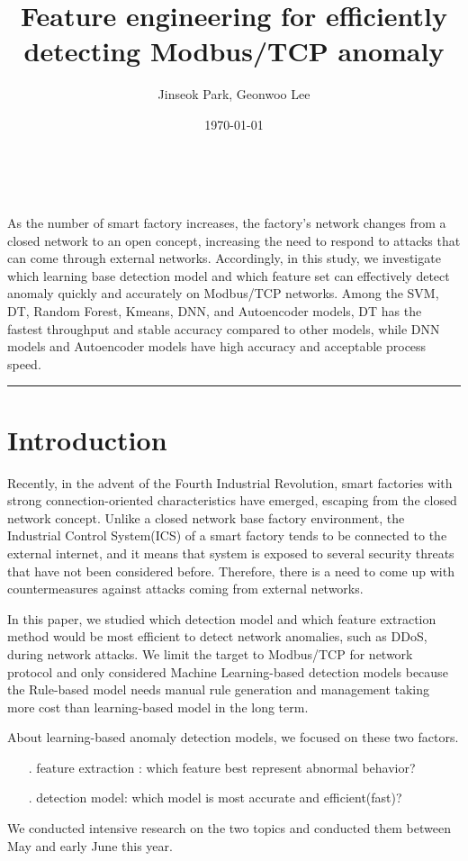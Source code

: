 \documentclass[fontsize=10pt]{article}
\title{
\Large Feature engineering for efficiently detecting Modbus/TCP anomaly \\
[10pt] 
}
\date{\today}
\author{Jinseok Park, Geonwoo Lee}
\makeatletter
\renewenvironment{abstract} %
 {\small
  \begin{center}
  \bfseries \abstractname\vspace{-.5em}\vspace{0pt}
  \end{center}
  \list{}{%
    \setlength{\leftmargin}{0mm}
    \setlength{\rightmargin}{\leftmargin}%
  }
  \item\relax}
 {\endlist}
\renewcommand{\maketitle}{\bgroup\setlength{\parindent}{0pt} %
\begin{flushleft}
  \textbf{\@title}
  \@author \\ 
  \@date
\end{flushleft}\egroup
}
\makeatother
\begin{document}
\maketitle

\begin{abstract}
As the number of smart factory increases, the factory's network changes from a closed network to an open concept, increasing the need to respond to attacks that can come through external networks. Accordingly, in this study, we investigate which learning base detection model and which feature set can effectively detect anomaly quickly and accurately on Modbus/TCP networks. Among the SVM, DT, Random Forest, Kmeans, DNN, and Autoencoder models, DT has the fastest throughput and stable accuracy compared to other models, while DNN models and Autoencoder models have high accuracy and acceptable process speed.
\end{abstract}

\rule{\linewidth}{0.5pt}


\section{Introduction}
Recently, in the advent of the Fourth Industrial Revolution, smart factories with strong connection-oriented characteristics have emerged, escaping from the closed network concept. Unlike a closed network base factory environment, the Industrial Control System(ICS) of a smart factory tends to be connected to the external internet, and it means that system is exposed to several security threats that have not been considered before. Therefore, there is a need to come up with countermeasures against attacks coming from external networks.


In this paper, we studied which detection model and which feature extraction method would be most efficient to detect network anomalies, such as DDoS, during network attacks. We limit the target to Modbus/TCP for network protocol and only considered Machine Learning-based detection models because the Rule-based model needs manual rule generation and management taking more cost than learning-based model in the long term.



About learning-based anomaly detection models, we focused on these two factors.
\begin{itemize}
    \item [.] feature extraction : which feature best represent abnormal behavior?
    \item [.] detection model: which model is most accurate and efficient(fast)?
\end{itemize}
We conducted intensive research on the two topics and conducted them between May and early June this year.
\end{document}
